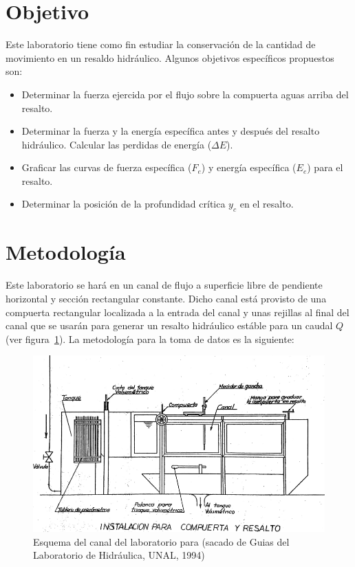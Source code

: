 \documentclass[10pt, a4paper]{exam}
\begin{document}
\section{Objetivo}
Este laboratorio tiene como fin estudiar la conservaci\'on de la cantidad de movimiento en un resaldo hidr\'aulico. Algunos objetivos espec\'ificos propuestos son:
\begin{itemize}
\item Determinar la fuerza ejercida por el flujo sobre la compuerta aguas arriba del resalto.
\item Determinar la fuerza y la energ\'ia espec\'ifica antes y despu\'es del resalto hidr\'aulico. Calcular las perdidas de energ\'ia ($\Delta E$).
\item Graficar las curvas de fuerza espec\'ifica ($F_e$) y energ\'ia espec\'ifica ($E_e$) para el resalto.
\item Determinar la posici\'on de la profundidad cr\'itica $y_c$ en el resalto.
\end{itemize}

\section{Metodolog\'ia}
Este laboratorio se har\'a en un canal de flujo a superficie libre de pendiente horizontal y secci\'on rectangular constante. Dicho canal est\'a provisto de una compuerta rectangular localizada a la entrada del canal y unas rejillas al final del canal que se usar\'an para generar un resalto hidr\'aulico est\'able para un caudal $Q$ (ver figura~\ref{can}). La metodolog\'ia para la toma de datos es la siguiente:
\begin{figure}[h]
    \centering
    \includegraphics[width=\textwidth]{canalRH.png}
    \caption{Esquema del canal del laboratorio para (sacado de Guias del Laboratorio de Hidr\'aulica, UNAL, 1994)}
    \label{can}
\end{figure}
\end{document}
